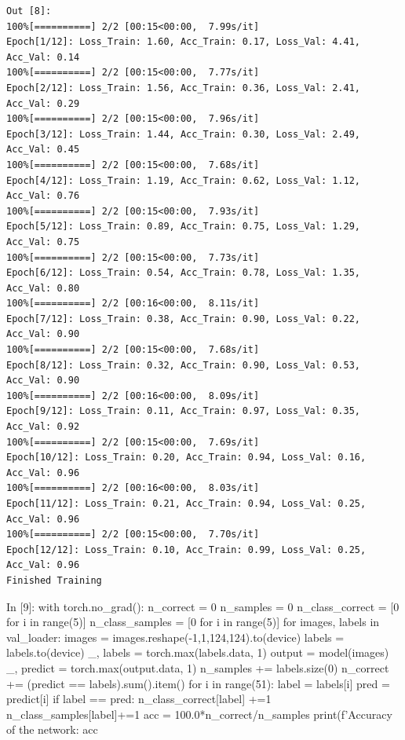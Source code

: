 \documentclass[12pt, a4paper]{article}
\begin{document}
\begin{verbatim}
Out [8]:
100%[==========] 2/2 [00:15<00:00,  7.99s/it]
Epoch[1/12]: Loss_Train: 1.60, Acc_Train: 0.17, Loss_Val: 4.41, Acc_Val: 0.14 
100%[==========] 2/2 [00:15<00:00,  7.77s/it]
Epoch[2/12]: Loss_Train: 1.56, Acc_Train: 0.36, Loss_Val: 2.41, Acc_Val: 0.29 
100%[==========] 2/2 [00:15<00:00,  7.96s/it]
Epoch[3/12]: Loss_Train: 1.44, Acc_Train: 0.30, Loss_Val: 2.49, Acc_Val: 0.45 
100%[==========] 2/2 [00:15<00:00,  7.68s/it]
Epoch[4/12]: Loss_Train: 1.19, Acc_Train: 0.62, Loss_Val: 1.12, Acc_Val: 0.76 
100%[==========] 2/2 [00:15<00:00,  7.93s/it]
Epoch[5/12]: Loss_Train: 0.89, Acc_Train: 0.75, Loss_Val: 1.29, Acc_Val: 0.75 
100%[==========] 2/2 [00:15<00:00,  7.73s/it]
Epoch[6/12]: Loss_Train: 0.54, Acc_Train: 0.78, Loss_Val: 1.35, Acc_Val: 0.80 
100%[==========] 2/2 [00:16<00:00,  8.11s/it]
Epoch[7/12]: Loss_Train: 0.38, Acc_Train: 0.90, Loss_Val: 0.22, Acc_Val: 0.90 
100%[==========] 2/2 [00:15<00:00,  7.68s/it]
Epoch[8/12]: Loss_Train: 0.32, Acc_Train: 0.90, Loss_Val: 0.53, Acc_Val: 0.90 
100%[==========] 2/2 [00:16<00:00,  8.09s/it]
Epoch[9/12]: Loss_Train: 0.11, Acc_Train: 0.97, Loss_Val: 0.35, Acc_Val: 0.92 
100%[==========] 2/2 [00:15<00:00,  7.69s/it]
Epoch[10/12]: Loss_Train: 0.20, Acc_Train: 0.94, Loss_Val: 0.16, Acc_Val: 0.96 
100%[==========] 2/2 [00:16<00:00,  8.03s/it]
Epoch[11/12]: Loss_Train: 0.21, Acc_Train: 0.94, Loss_Val: 0.25, Acc_Val: 0.96 
100%[==========] 2/2 [00:15<00:00,  7.70s/it]
Epoch[12/12]: Loss_Train: 0.10, Acc_Train: 0.99, Loss_Val: 0.25, Acc_Val: 0.96 
Finished Training
\end{verbatim}
\begin{python}
In [9]: with torch.no_grad():
            n_correct = 0
            n_samples = 0
            n_class_correct = [0 for i in range(5)]
            n_class_samples = [0 for i in range(5)]
            for images, labels in val_loader:
                images = images.reshape(-1,1,124,124).to(device)
                labels = labels.to(device)
                _, labels = torch.max(labels.data, 1)
                output = model(images)
                _, predict = torch.max(output.data, 1)
                n_samples += labels.size(0)
                n_correct += (predict == labels).sum().item()
                for i in range(51):
                    label = labels[i]
                    pred = predict[i]
                    if label == pred:
                        n_class_correct[label] +=1
                    n_class_samples[label]+=1
            acc = 100.0*n_correct/n_samples
            print(f'Accuracy of the network: {acc} %
\end{python}
\end{document}

